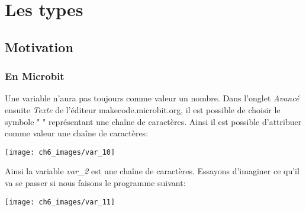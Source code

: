 \documentclass[11pt, a4paper]{book}
\begin{document}






\section{Les types}

\subsection{Motivation}

\subsubsection{En Microbit}

Une variable n'aura pas toujours comme valeur un nombre. Dans l'onglet {\it Avancé} ensuite {\it Texte} de l'éditeur makecode.microbit.org, il est possible de choisir le symbole " " représentant une chaîne de caractères. Ainsi il est possible d'attribuer comme valeur une chaîne de caractères: 

\begin{center}
\texttt{[image: ch6\_images/var\_10]}
\end{center}

Ainsi la variable {\it var\_2} est une chaîne de caractères. Essayons d'imaginer ce qu'il va se passer si nous faisons le programme suivant:

\begin{center}
\texttt{[image: ch6\_images/var\_11]}
\end{center}
\end{document}
